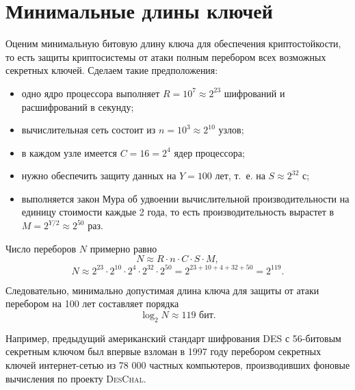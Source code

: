 \section{Минимальные длины ключей}

Оценим минимальную битовую длину ключа для обеспечения криптостойкости, то есть защиты криптосистемы от атаки полным перебором всех возможных секретных ключей. Сделаем такие предположения:

\begin{itemize}
    \item одно ядро процессора выполняет $R = 10^7 \approx 2^{23}$ шифрований и расшифрований в секунду;
    \item вычислительная сеть состоит из $n = 10^3 \approx 2^{10}$ узлов;
    \item в каждом узле имеется $C = 16 = 2^4$ ядер процессора;
    \item нужно обеспечить защиту данных на $Y = 100$ лет, т.~е. на $S \approx 2^{32}$ с;
    \item выполняется закон Мура об удвоении вычислительной производительности на единицу стоимости каждые 2 года, то есть производительность вырастет в $M = 2^{Y/2} \approx 2^{50}$ раз.
\end{itemize}

Число переборов $N$ примерно равно
    \[ N \approx R \cdot n \cdot C \cdot S \cdot M, \]
    \[ N \approx 2^{23} \cdot 2^{10} \cdot 2^{4} \cdot 2^{32} \cdot 2^{50} = 2^{23+10+4+32+50} = 2^{119}. \]

Следовательно, минимально допустимая длина ключа для защиты от атаки перебором на 100 лет составляет порядка
    \[ \log_2 N \approx 119\text{ бит}. \]

Например, предыдущий американский стандарт шифрования DES с 56-битовым секретным ключом был впервые взломан в 1997 году перебором секретных ключей интернет-сетью из 78 000 частных компьютеров, производивших фоновые вычисления по проекту \textsc{DesChal}.
